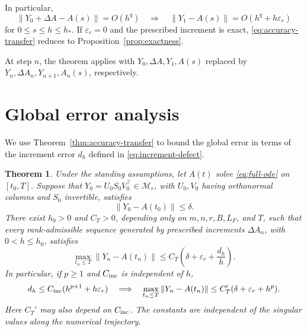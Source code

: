\documentclass[]{article}
\numberwithin{equation}{section}
\theoremstyle{plain}
\newtheorem{theorem}{Theorem}[section]
\theoremstyle{remark}
\numberwithin{algorithm}{section}
\newcommand{\Mr}{\mathcal{M}_r}
\newcommand{\eps}{\varepsilon}
\begin{document}
In particular,
\begin{equation}\label{eq:accuracy-transfer-consequence}
 \|Y_0+\Delta A-A(s)\|=O(h^q)
 \quad\Longrightarrow\quad
 \|Y_1-A(s)\|=O(h^q+h\eps_r)
\end{equation}
for \(0\le s\le h\le h_*\).  If \(\eps_r=0\) and the prescribed increment is
exact, \eqref{eq:accuracy-transfer} reduces to
Proposition~\ref{prop:exactness}.

At step \(n\), the theorem applies with \(Y_0,\Delta A,Y_1,A(s)\)
replaced by \(Y_n,\Delta A_n,Y_{n+1},A_n(s)\), respectively.

\section{Global error analysis}
\label{sec:global}

We use Theorem~\ref{thm:accuracy-transfer} to bound the global error in
terms of the increment error \(d_h\) defined in \eqref{eq:increment-defect}.

\begin{theorem}
\label{thm:general-increments}
Under the standing assumptions, let
\(A(t)\) solve \eqref{eq:full-ode} on \([t_0,T]\).  Suppose that
\(Y_0=U_0S_0V_0^\top\in\Mr\), with \(U_0,V_0\) having orthonormal columns
and \(S_0\) invertible, satisfies
\begin{equation}\label{eq:initial-error}
 \|Y_0-A(t_0)\|\le\delta.
\end{equation}
There exist \(h_0>0\) and \(C_T>0\), depending only on
\(m,n,r,B,L_F\), and \(T\), such that every rank-admissible sequence generated
by prescribed increments \(\Delta A_n\), with \(0<h\le h_0\), satisfies
\begin{equation}\label{eq:general-increment-global-error}
 \max_{t_n\le T}\|Y_n-A(t_n)\|
 \le C_T\left(\delta+\eps_r+\frac{d_h}{h}\right).
\end{equation}
In particular, if \(p\ge1\) and \(C_{\rm inc}\) is independent of \(h\),
\begin{equation}\label{eq:increment-order-transfer}
 d_h\le C_{\rm inc}(h^{p+1}+h\eps_r)
 \quad\Longrightarrow\quad
 \max_{t_n\le T}\|Y_n-A(t_n)\|
 \le C_T'(\delta+\eps_r+h^p).
\end{equation}
Here \(C_T'\) may also depend on \(C_{\rm inc}\).  The constants are
independent of the singular values along the numerical trajectory.
\end{theorem}
\end{document}

